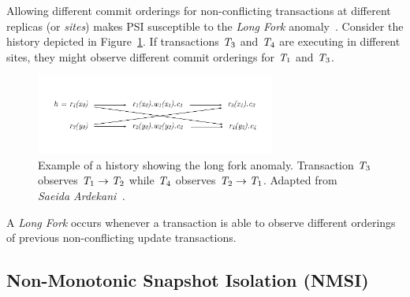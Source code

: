 Allowing different commit orderings for non-conflicting transactions at different replicas (or \emph{sites}) makes PSI susceptible to the \emph{Long Fork} anomaly~\citep{psi-intro}. Consider the history depicted in Figure~\ref{fig:long_fork_history}. If transactions $\mathit{T}_3$ and $\mathit{T}_4$ are executing in different sites, they might observe different commit orderings for $\mathit{T}_1$ and $\mathit{T}_3$.

\begin{figure}[h]
  \centering
  \vspace{-0.5cm}
  \includegraphics[width=0.7\textwidth]{figures/long_fork_hist.pdf}
  \vspace{-0.5cm}
  \caption{Example of a history showing the long fork anomaly. Transaction $\mathit{T}_3$ observes $\mathit{T}_1 \rightarrow \mathit{T}_2$ while $\mathit{T}_4$ observes $\mathit{T}_2 \rightarrow \mathit{T}_1$. Adapted from \em{Saeida Ardekani~\citep{ardekani_thesis}}.}
  \label{fig:long_fork_history}
\end{figure}

\begin{definition}
A \emph{Long Fork} occurs whenever a transaction is able to observe different orderings of previous non-conflicting update transactions.
\end{definition}


\subsection{Non-Monotonic Snapshot Isolation (NMSI)}




